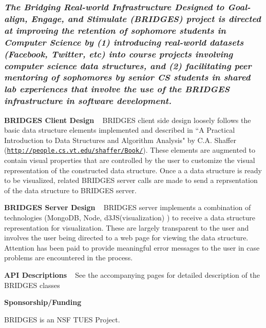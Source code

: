\subsubsection*{{\itshape The Bridging Real-\/world Infrastructure Designed to Goal-\/align, Engage, and Stimulate ({\bfseries B\+R\+I\+D\+G\+E\+S}) project is directed at improving the retention of sophomore students in Computer Science by (1) introducing real-\/world datasets (Facebook, Twitter, etc) into course projects involving computer science data structures, and (2) facilitating peer mentoring of sophomores by senior C\+S students in shared lab experiences that involve the use of the B\+R\+I\+D\+G\+E\+S infrastructure in software development.}}

{\bfseries B\+R\+I\+D\+G\+E\+S Client Design }~\newline
 B\+R\+I\+D\+G\+E\+S client side design loosely follows the basic data structure elements implemented and described in ``\+A Practical Introduction to Data Structures and Algorithm Analysis" by C.\+A. Shaffer (\href{http://people.cs.vt.edu/shaffer/Book/}{\tt http\+://people.\+cs.\+vt.\+edu/shaffer/\+Book/}). These elements are augmented to contain visual properties that are controlled by the user to customize the visual representation of the constructed data structure. Once a a data structure is ready to be visualized, related B\+R\+I\+D\+G\+E\+S server calls are made to send a reprsentation of the data structure to B\+R\+I\+D\+G\+E\+S server.

{\bfseries B\+R\+I\+D\+G\+E\+S Server Design }~\newline
 B\+R\+I\+D\+G\+E\+S server implements a combination of technologies (Mongo\+D\+B, Node, d3\+J\+S(visualization) ) to receive a data structure representation for visualization. These are largely transparent to the user and involves the user being directed to a web page for viewing the data structure. Attention has been paid to provide meaningful error messages to the user in case problems are encountered in the process.

{\bfseries  A\+P\+I Descriptions} ~\newline
 See the accompanying pages for detailed description of the B\+R\+I\+D\+G\+E\+S classes

{\bfseries  Sponsorship/\+Funding}

B\+R\+I\+D\+G\+E\+S is an N\+S\+F T\+U\+E\+S Project. 